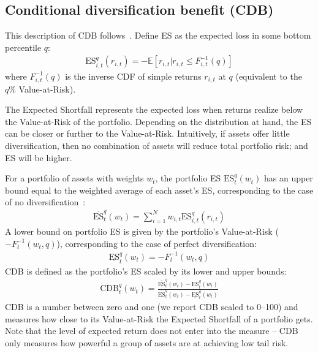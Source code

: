 
\subsection{Conditional diversification benefit (CDB)} %
\label{sub:conditional_diversification_benefit}

This description of CDB follows~\textcite{ChristoffersenErrunzaJacobLanglois2012}. Define ES as the expected loss in some bottom percentile $q$:
\begin{align}
    \text{ES}_{i,t}^q(r_{i,t}) = -\mathbb{E}[r_{i,t} | r_{i,t} \leq F_{i,t}^{-1}(q)]
\end{align}
where $F_{i,t}^{-1}(q)$ is the inverse CDF of simple returns $r_{i,t}$ at $q$ (equivalent to the $q\%$ Value-at-Risk). 

The Expected Shortfall represents the expected loss when returns realize below the Value-at-Risk of the portfolio. Depending on the distribution at hand, the ES can be closer or further to the Value-at-Risk. Intuitively, if assets offer little diversification, then no combination of assets will reduce total portfolio risk; and ES will be higher. 

For a portfolio of assets with weights $w_t$, the portfolio ES $\text{ES}_t^q(w_t)$ has an upper bound equal to the weighted average of each asset's ES, corresponding to the case of no diversification~\autocite{Artzner1999}:
\begin{align}
  \overline{\text{ES}}_t^q(w_t) = \sum_{i=1}^N w_{i,t} \text{ES}_{i,t}^q(r_{i,t})
\end{align}
A lower bound on portfolio ES is given by the portfolio's Value-at-Risk ($-F_{t}^{-1}(w_t, q)$), corresponding to the case of perfect diversification:
\begin{align}
  \underline{\text{ES}}_t^q(w_t) = -F_{t}^{-1}(w_t, q)
\end{align}
CDB is defined as the portfolio's ES scaled by its lower and upper bounds:
\begin{align}
  \text{CDB}_t^q(w_t) = \frac{\overline{\text{ES}}_t^q(w_t) - \text{ES}_t^q(w_t)}{\overline{\text{ES}}_t^q(w_t) - \underline{\text{ES}}_t^q(w_t)}
\end{align}
CDB is a number between zero and one (we report CDB scaled to 0--100) and measures how close to its Value-at-Risk the Expected Shortfall of a portfolio gets. Note that the level of expected return does not enter into the measure -- CDB only measures how powerful a group of assets are at achieving low tail risk.

